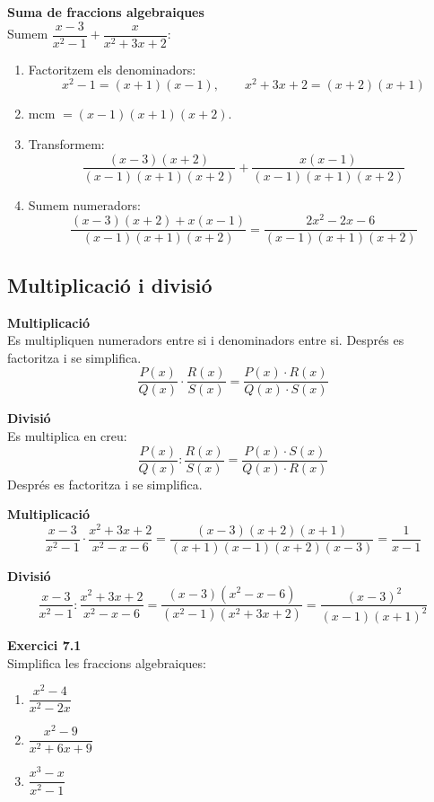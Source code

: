 \documentclass[12pt]{article}
\begin{document}
\begin{exemple}
\textbf{Suma de fraccions algebraiques}\\
Sumem $\dfrac{x-3}{x^2-1} + \dfrac{x}{x^2+3x+2}$:
\begin{enumerate}
    \item Factoritzem els denominadors:
    \[
    x^2-1 = (x+1)(x-1), \qquad x^2+3x+2 = (x+2)(x+1)
    \]
    \item mcm $= (x-1)(x+1)(x+2)$.
    \item Transformem:
    \[
    \dfrac{(x-3)(x+2)}{(x-1)(x+1)(x+2)} + \dfrac{x(x-1)}{(x-1)(x+1)(x+2)}
    \]
    \item Sumem numeradors:
    \[
    \dfrac{(x-3)(x+2) + x(x-1)}{(x-1)(x+1)(x+2)} = \dfrac{2x^2 - 2x - 6}{(x-1)(x+1)(x+2)}
    \]
\end{enumerate}
\end{exemple}

\subsection{Multiplicació i divisió}

\begin{concept}
\textbf{Multiplicació}\\
Es multipliquen numeradors entre si i denominadors entre si. Després es factoritza i se simplifica.
\[
\dfrac{P(x)}{Q(x)} \cdot \dfrac{R(x)}{S(x)} = \dfrac{P(x) \cdot R(x)}{Q(x) \cdot S(x)}
\]

\textbf{Divisió}\\
Es multiplica en creu:
\[
\dfrac{P(x)}{Q(x)} : \dfrac{R(x)}{S(x)} = \dfrac{P(x) \cdot S(x)}{Q(x) \cdot R(x)}
\]
Després es factoritza i se simplifica.
\end{concept}

\begin{exemple}
\textbf{Multiplicació}
\[
\dfrac{x-3}{x^2-1} \cdot \dfrac{x^2+3x+2}{x^2-x-6} = \dfrac{(x-3)(x+2)(x+1)}{(x+1)(x-1)(x+2)(x-3)} = \dfrac{1}{x-1}
\]

\textbf{Divisió}
\[
\dfrac{x-3}{x^2-1} : \dfrac{x^2+3x+2}{x^2-x-6} = \dfrac{(x-3)(x^2-x-6)}{(x^2-1)(x^2+3x+2)} = \dfrac{(x-3)^2}{(x-1)(x+1)^2}
\]
\end{exemple}

\begin{exercici}
\textbf{Exercici 7.1}\\
Simplifica les fraccions algebraiques:
\begin{enumerate}[label=\alph*)]
    \item $\dfrac{x^2-4}{x^2-2x}$
    \item $\dfrac{x^2-9}{x^2+6x+9}$
    \item $\dfrac{x^3-x}{x^2-1}$
\end{enumerate}
\end{exercici}
\end{document}
